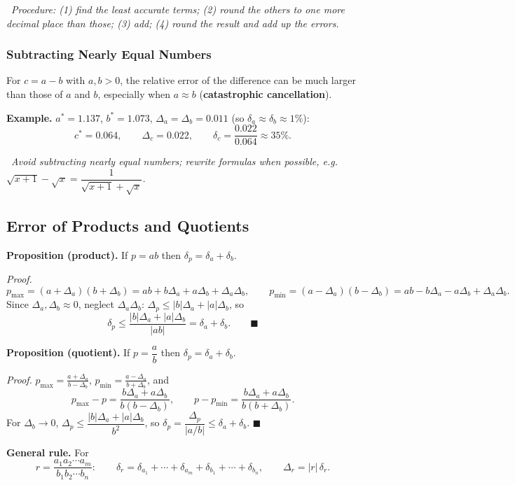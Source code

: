 \documentclass[hidelinks]{article}
\newcommand{\callout}[1]{\par\smallskip\noindent{\color{capri}$\blacktriangleright$}\ \textit{#1}\par\smallskip}
\newcommand{\abs}[1]{\left|#1\right|}
\begin{document}
\callout{Procedure: (1) find the least accurate terms; (2) round the others to one more decimal place than those; (3) add; (4) round the result and add up the errors.}

\subsubsection{Subtracting Nearly Equal Numbers}

For $c=a-b$ with $a,b>0$, the relative error of the difference can be much larger than those of $a$ and $b$, especially when $a\approx b$ (\textbf{catastrophic cancellation}).

\textbf{Example.} $a^*=1.137$, $b^*=1.073$, $\Delta_a=\Delta_b=0.011$ (so $\delta_a\approx\delta_b\approx1\%$):
\[
c^*=0.064,\qquad \Delta_c=0.022,\qquad \delta_c=\frac{0.022}{0.064}\approx35\%.
\]

\callout{Avoid subtracting nearly equal numbers; rewrite formulas when possible, e.g.\ $\sqrt{x+1}-\sqrt{x}=\dfrac{1}{\sqrt{x+1}+\sqrt{x}}$.}

\subsection{Error of Products and Quotients}\label{sec:muldiv}

\textbf{Proposition (product).} If $p=ab$ then $\delta_p=\delta_a+\delta_b$.

\emph{Proof.}
\[
p_{\max}=(a+\Delta_a)(b+\Delta_b)=ab+b\Delta_a+a\Delta_b+\Delta_a\Delta_b,\qquad
p_{\min}=(a-\Delta_a)(b-\Delta_b)=ab-b\Delta_a-a\Delta_b+\Delta_a\Delta_b.
\]
Since $\Delta_a,\Delta_b\approx0$, neglect $\Delta_a\Delta_b$: $\Delta_p\le\abs{b}\Delta_a+\abs{a}\Delta_b$, so
\[
\delta_p\le\frac{\abs{b}\Delta_a+\abs{a}\Delta_b}{\abs{ab}}=\delta_a+\delta_b.\qquad\blacksquare
\]

\textbf{Proposition (quotient).} If $p=\dfrac ab$ then $\delta_p=\delta_a+\delta_b$.

\emph{Proof.} $p_{\max}=\frac{a+\Delta_a}{b-\Delta_b}$, $p_{\min}=\frac{a-\Delta_a}{b+\Delta_b}$, and
\[
p_{\max}-p=\frac{b\Delta_a+a\Delta_b}{b(b-\Delta_b)},\qquad
p-p_{\min}=\frac{b\Delta_a+a\Delta_b}{b(b+\Delta_b)}.
\]
For $\Delta_b\to0$, $\Delta_p\le\dfrac{\abs b\Delta_a+\abs a\Delta_b}{b^2}$, so $\delta_p=\dfrac{\Delta_p}{\abs{a/b}}\le\delta_a+\delta_b$. $\blacksquare$

\textbf{General rule.} For
\[
r=\frac{a_1a_2\cdots a_m}{b_1b_2\cdots b_n}:\qquad \delta_r=\delta_{a_1}+\cdots+\delta_{a_m}+\delta_{b_1}+\cdots+\delta_{b_n},\qquad \Delta_r=\abs{r}\,\delta_r.
\]
\end{document}
